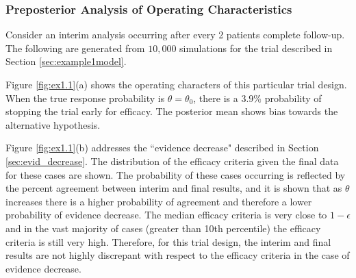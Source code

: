 \documentclass[useAMS,usenatbib,referee]{biom}
\begin{document}
\subsubsection{Preposterior Analysis of Operating Characteristics}\label{sec:ex1.1}
Consider an interim analysis occurring after every 2 patients complete follow-up. The following are generated from $10,000$ simulations for the trial described in Section \ref{sec:example1model}.

Figure \ref{fig:ex1.1}(a) shows the operating characters of this particular trial design.
%
%
When the true response probability is $\theta=\theta_0$, there is a $3.9\%$ probability of stopping the trial early for efficacy. 
%
The posterior mean shows bias towards the alternative hypothesis.

Figure \ref{fig:ex1.1}(b) addresses the ``evidence decrease" described in Section \ref{sec:evid_decrease}. The distribution of the efficacy criteria given the final data for these cases are shown. The probability of these cases occurring is reflected by the percent agreement between interim and final results, and it is shown that as $\theta$ increases there is a higher probability of agreement and therefore a lower probability of evidence decrease.
%
The median efficacy criteria is very close to $1-\epsilon$ and in the vast majority of cases (greater than 10th percentile) the efficacy criteria is still very high. Therefore, for this trial design, the interim and final results are not highly discrepant with respect to the efficacy criteria in the case of evidence decrease.
\end{document}
